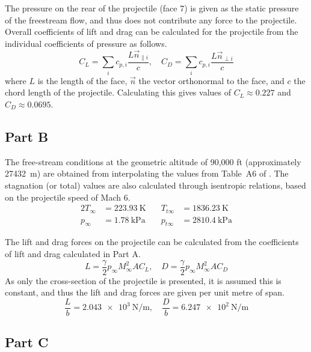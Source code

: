 \documentclass[a4paper]{article}
\begin{document}
The pressure on the rear of the projectile (face 7) is given as the static pressure of the freestream flow, and thus does not contribute any force to the projectile.
Overall coefficients of lift and drag can be calculated for the projectile from the individual coefficients of pressure as follows.
\begin{equation*}
	C_L = \sum_i c_{p,i} \frac{L\vec{n}_{\parallel i}}{c}, \quad
	C_D = \sum_i c_{p,i} \frac{L\vec{n}_{\perp i}}{c}
\end{equation*}
where \(L\) is the length of the face, \(\vec{n}\) the vector orthonormal to the face, and \(c\) the chord length of the projectile. Calculating this gives values of \(C_L \approx 0.227\) and \(C_D \approx 0.0695\).

\subsection*{Part B}
The free-stream conditions at the geometric altitude of 90,000 ft (approximately \SI{27432}{\metre}) are obtained from interpolating the values from Table~A6 of \cite{white2011fluid}.
The stagnation (or total) values are also calculated through isentropic relations, based on the projectile speed of Mach 6.
\begin{alignat*}{2}
	T_\infty    &= \SI{223.93}{\kelvin} &\quad
	T_{t\infty} &= \SI{1836.23}{\kelvin} \\
	p_\infty    &= \SI{1.78}{\kilo\pascal} &\quad
	p_{t\infty} &= \SI{2810.4}{\kilo\pascal}
\end{alignat*}

The lift and drag forces on the projectile can be calculated from the coefficients of lift and drag calculated in Part A.
\begin{equation*}
	L = \frac{\gamma}{2}p_\infty M_\infty^2 A C_L, \quad
	D = \frac{\gamma}{2}p_\infty M_\infty^2 A C_D
\end{equation*}
As only the cross-section of the projectile is presented, it is assumed this is constant, and thus the lift and drag forces are given per unit metre of span.
\begin{equation*}
	\frac{L}{b} = \SI{2.043e3}{\newton\per\metre},
	\quad
	\frac{D}{b} = \SI{6.247e2}{\newton\per\metre}
\end{equation*}

\subsection*{Part C}
\end{document}
